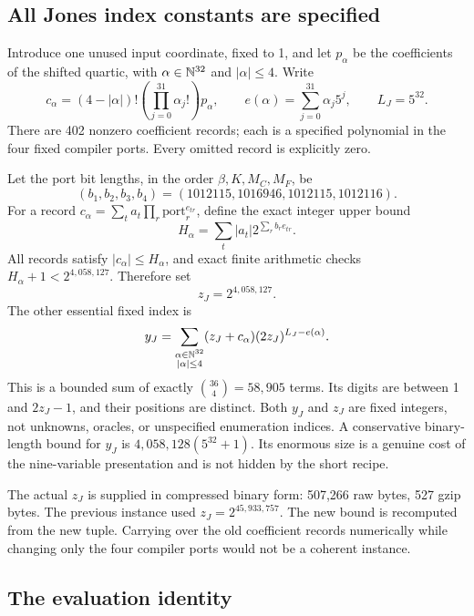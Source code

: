 \subsection{All Jones index constants are specified}

Introduce one unused input coordinate, fixed to 1, and let $p_\alpha$ be
the coefficients of the shifted quartic, with $\alpha\in\mathbb N^{32}$ and
$|\alpha|\le4$. Write
\[
 c_\alpha=(4-|\alpha|)!\left(\prod_{j=0}^{31}\alpha_j!\right)p_\alpha,
 \qquad e(\alpha)=\sum_{j=0}^{31}\alpha_j5^j,
 \qquad L_J=5^{32}.
\]
There are 402 nonzero coefficient records; each is a specified polynomial
in the four fixed compiler ports. Every omitted record is explicitly zero.

Let the port bit lengths, in the order $\beta,K,M_C,M_F$, be
\[
 (b_1,b_2,b_3,b_4)=(1012115,1016946,1012115,1012116).
\]
For a record $c_\alpha=\sum_t a_t\prod_r\mathrm{port}_r^{e_{tr}}$,
define the exact integer upper bound
\[
 H_\alpha=\sum_t|a_t|2^{\sum_r b_re_{tr}}.
\]
All records satisfy $|c_\alpha|\le H_\alpha$, and exact finite arithmetic
checks $H_\alpha+1<2^{4,058,127}$. Therefore set
\begin{equation}\boxed{z_J=2^{4,058,127}.}\label{eq:jones-z}
\end{equation}
The other essential fixed index is
\begin{equation}
 y_J=\sum_{\substack{\alpha\in\mathbb N^{32}\\|\alpha|\le4}}
        (z_J+c_\alpha)(2z_J)^{L_J-e(\alpha)}.
 \label{eq:jones-y}
\end{equation}
This is a bounded sum of exactly $\binom{36}{4}=58,905$ terms. Its digits
are between 1 and $2z_J-1$, and their positions are distinct. Both $y_J$
and $z_J$ are fixed integers, not unknowns, oracles, or unspecified
enumeration indices. A conservative binary-length bound for $y_J$ is
$4,058,128(5^{32}+1)$. Its enormous size is a genuine cost of the
nine-variable presentation and is not hidden by the short recipe.

The actual $z_J$ is supplied in compressed binary form: 507,266 raw bytes,
527 gzip bytes. The previous instance used $z_J=2^{45,933,757}$.
The new bound is recomputed from the new tuple. Carrying over the old
coefficient records numerically while changing only the four compiler ports
would not be a coherent instance.

\subsection{The evaluation identity}

